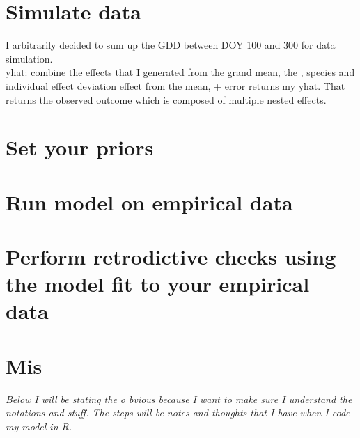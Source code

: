 \documentclass[a4paper,12pt]{article}
\begin{document}
\section{Simulate data}
I arbitrarily decided to sum up the GDD between DOY 100 and 300 for data simulation. \\
yhat: combine the effects that I generated from the grand mean, the , species and individual effect deviation effect from the mean, + error returns my yhat. That returns the observed outcome which is composed of multiple nested effects. 

\section{Set your priors}

\section{Run model on empirical data}

\section{Perform retrodictive checks using the model fit to your empirical data}

\section{Mis}

\newpage
\textit{Below I will be stating the o bvious because I want to make sure I understand the notations and stuff. The steps will be notes and thoughts that I have when I code my model in R.}
\end{document}
